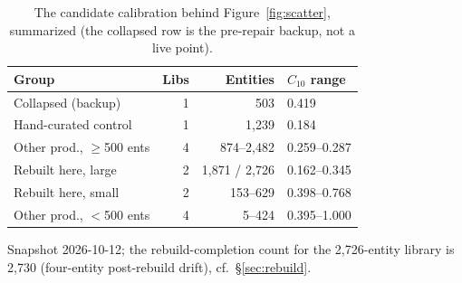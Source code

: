 \documentclass[sigconf,nonacm,anonymous]{acmart}
\begin{document}
\begin{table}[t]
\centering
\caption{The candidate calibration behind Figure~\ref{fig:scatter},
summarized (the collapsed row is the pre-repair backup, not a live
point).}
\label{tab:kbstats}
\small
\begin{tabular}{@{}lrrl@{}}
\toprule
Group & Libs & Entities & $C_{10}$ range \\
\midrule
Collapsed (backup) & 1 & 503 & 0.419 \\
Hand-curated control & 1 & 1{,}239 & 0.184 \\
Other prod., $\geq$500 ents & 4 & 874--2{,}482 & 0.259--0.287 \\
Rebuilt here, large & 2 & 1{,}871 / 2{,}726 & 0.162--0.345 \\
Rebuilt here, small & 2 & 153--629 & 0.398--0.768 \\
Other prod., $<$500 ents & 4 & 5--424 & 0.395--1.000 \\
\bottomrule
\end{tabular}
\begin{flushleft}\footnotesize Snapshot 2026-10-12; the rebuild-completion
count for the 2{,}726-entity library is 2{,}730 (four-entity post-rebuild
drift), cf.\ \S\ref{sec:rebuild}.
\end{flushleft}
\end{table}
\end{document}
